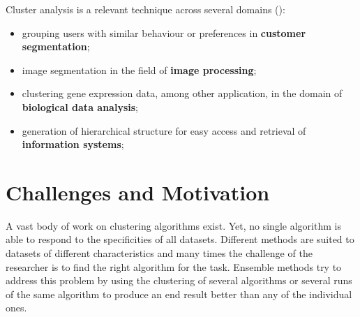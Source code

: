Cluster analysis is a relevant technique across several domains (\cite{Aggarwal2014}):

\begin{itemize}
	\item grouping users with similar behaviour or preferences in \textbf{customer segmentation};
	\item image segmentation in the field of \textbf{image processing};
	\item clustering gene expression data, among other application, in the domain of \textbf{biological data analysis};
	\item generation of hierarchical structure for easy access and retrieval of \textbf{information systems}; %
\end{itemize}




\section{Challenges and Motivation}

A vast body of work on clustering algorithms exist.
Yet, no single algorithm is able to respond to the specificities of all datasets.
Different methods are suited to datasets of different characteristics and many times the challenge of the researcher is to find the right algorithm for the task. %
Ensemble methods try to address this problem by using the clustering of several algorithms or several runs of the same algorithm to produce an end result better than any of the individual ones.

